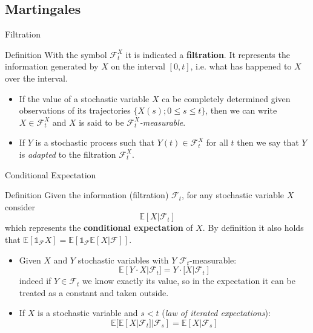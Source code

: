 \documentclass{beamer}
\begin{document}
\subsection{Martingales}
\begin{frame}{Filtration}
	\begin{block}{Definition}
		With the symbol $\mathcal{F}^X_t$ it is indicated a \textbf{filtration}. It represents the information generated by $X$ on the interval $[0, t]$, i.e. what has happened to $X$ over the interval. 
	\end{block}
	\begin{itemize}	
		\item If the value of a stochastic variable $X$ ca be completely determined given observations of its trajectories $\{X(s); 0\leq s \leq t\}$, then we can write $X\in\mathcal{F}_t^X$ and $X$ is said to be $\mathcal{F}_t^X$\emph{-measurable}.
		\item If $Y$ is a stochastic process such that $Y(t)\in\mathcal{F}_t^X$ for all $t$ then we say that $Y$ is \emph{adapted} to the filtration $\mathcal{F}_t^X$. 
	\end{itemize}
\end{frame}

\begin{frame}{Conditional Expectation}
	\begin{block}{Definition}
		Given the information (filtration) $\mathcal{F}_t$, for any stochastic variable $X$ consider
		\begin{equation*}
			\mathbb{E}[X|\mathcal{F}_t]
		\end{equation*}
		which represents the \textbf{conditional expectation} of $X$.
		By definition it also holds that $\mathbb{E}[\mathbb{1}_{\mathcal{F}}X] = \mathbb{E}[\mathbb{1}_{\mathcal{F}}\mathbb{E}[X|\mathcal{F}]]$.
	\end{block}
	\begin{itemize}
		\item Given $X$ and $Y$ stochastic variables with $Y$ $\mathcal{F}_t$-measurable:
		\begin{equation*}
			\mathbb{E}[Y\cdot X|\mathcal{F}_t] =  Y\cdot\mathbb[X|\mathcal{F}_t]
		\end{equation*}
		indeed if $Y\in\mathcal{F}_t$ we know exactly its value, so in the expectation it can be treated as a constant and taken outside.
		\item If $X$ is a stochastic variable and $s<t$ (\emph{law of iterated expectations}):
		\begin{equation*}
			\mathbb{E}[\mathbb{E}[X|\mathcal{F}_t]|\mathcal{F}_s] = \mathbb{E}[X|\mathcal{F}_s]
		\end{equation*}
	\end{itemize}
\end{frame}
\end{document}
